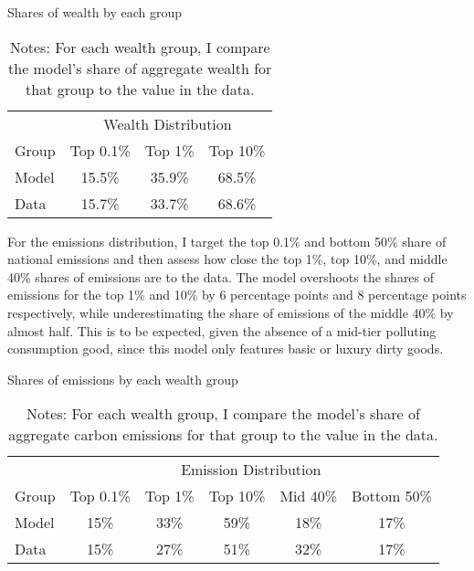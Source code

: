 \documentclass[12pt,a4paper]{article}
\begin{document}
 \begin{table}[h]
 \caption{Shares of wealth by each group}
   \centering
   \begin{tabular}{l c c c}
     \toprule
     & \multicolumn{3}{c}{Wealth Distribution} \\
     \cmidrule(lr){2-4}
     Group & {Top 0.1\%}  & {Top 1\%} & {Top 10\%}  \\
     \midrule
     Model &    15.5\%  &   35.9\%  &   68.5\%  \\
     Data  &    15.7\%  &   33.7\%  &   68.6\% \\
     \bottomrule
   \end{tabular}
    \captionsetup{font=footnotesize}
 \caption*{Notes: For each wealth group, I compare the model's share of aggregate wealth for that group to the value in the data. }

 \end{table}
 
\hspace*{6mm} For the emissions distribution, I target the top 0.1\%  and bottom 50\% share of national emissions and then assess how close the top 1\%, top 10\%, and middle 40\% shares of emissions are to the data. The model overshoots the shares of emissions for the top 1\% and 10\% by 6 percentage points and 8 percentage points respectively, while underestimating the share of emissions of the middle 40\% by almost half. This is to be expected, given the absence of a mid-tier polluting consumption good, since this model only features basic or luxury dirty goods. 
 
 
 \vspace{1em}
 \begin{table}[ht]
  \caption{Shares of emissions by each wealth group}
   \centering
   \begin{tabular}{l c c c c c }
     \toprule
     & \multicolumn{5}{c}{Emission Distribution} \\
     \cmidrule(lr){2-6}
     Group & {Top 0.1\%} & {Top 1\%} & {Top 10\%} & {Mid 40\%} & {Bottom 50\%} \\
     \midrule
    Model &    15\% &   33\% &   59\% &  18\%  &   17\%     \\
     Data & 15\% & 27\% & 51\% & 32\% & 17\% \\
     \bottomrule
   \end{tabular}
    \captionsetup{font=footnotesize}
 \caption*{Notes: For each wealth group, I compare the model's share of aggregate carbon emissions for that group to the value in the data. }

 \end{table}
 
\end{document}
